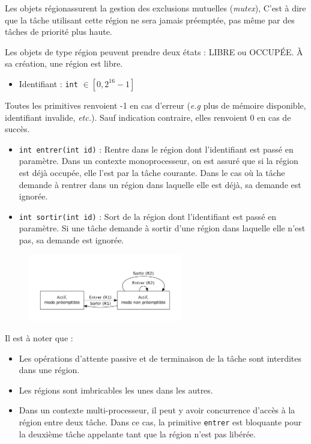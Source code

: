 {
	Les objets \og région\fg assurent la gestion des exclusions mutuelles (\textsl{mutex}), C'est à dire que la tâche utilisant cette région ne sera jamais préemptée, pas même par des tâches de priorité plus haute.

	Les objets de type région peuvent prendre deux états : LIBRE ou OCCUPÉE. À sa création, une région est libre.
}
{
	\begin{itemize}
		\item Identifiant : \lstinline {int} $\in [0, 2^{16} - 1]$
	\end{itemize}
}
{
	Toutes les primitives renvoient -1 en cas d'erreur (\textsl{e.g} plus de mémoire disponible, identifiant invalide, \textsl{etc.}). Sauf indication contraire, elles renvoient 0 en cas de succès.

	\begin{itemize}
		\item \lstinline {int entrer(int id)} : Rentre dans le région dont l'identifiant est passé en paramètre. Dans un contexte monoprocesseur, on est assuré que si la région est déjà occupée, elle l'est par la tâche courante. Dans le cas où la tâche demande à rentrer dans un région dans laquelle elle est déjà, sa demande est ignorée.
		\item \lstinline {int sortir(int id)} : Sort de la région dont l'identifiant est passé en paramètre. Si une tâche demande à sortir d'une région dans laquelle elle n'est pas, sa demande est ignorée.
	\end{itemize}
}
{
\begin{figure} [htp]
\centering
\includegraphics[width=0.6\textwidth]{img/etatRegion.pdf}
\end{figure}
}
{
	Il est à noter que :
	\begin{itemize}
		\item Les opérations d'attente passive et de terminaison de la tâche sont interdites dans une région.
		\item Les régions sont imbricables les unes dans les autres.
		\item Dans un contexte multi-processeur, il peut y avoir concurrence d'accès à la région entre deux tâche. Dans ce cas, la primitive \lstinline {entrer} est bloquante pour la deuxième tâche appelante tant que la région n'est pas libérée.
	\end{itemize}
}
